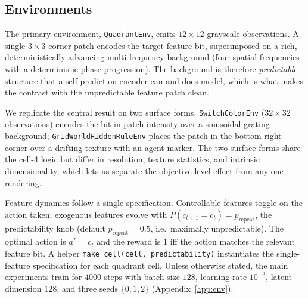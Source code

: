 \documentclass[11pt]{article}
\begin{document}
\subsection{Environments}
The primary environment, \texttt{QuadrantEnv}, emits $12\times12$ grayscale observations. A single
$3\times3$ corner patch encodes the target feature bit, superimposed on a rich,
deterministically-advancing multi-frequency background (four spatial frequencies with a
deterministic phase progression). The background is therefore \emph{predictable} structure that a
self-prediction encoder can and does model, which is what makes the contrast with the unpredictable
feature patch clean.

We replicate the central result on two surface forms. \texttt{SwitchColorEnv} ($32\times32$
observations) encodes the bit in patch intensity over a sinusoidal grating background;
\texttt{GridWorldHiddenRuleEnv} places the patch in the bottom-right corner over a drifting texture
with an agent marker. The two surface forms share the cell-4 logic but differ in resolution,
texture statistics, and intrinsic dimensionality, which lets us separate the objective-level effect
from any one rendering.

Feature dynamics follow a single specification. Controllable features toggle on the action taken;
exogenous features evolve with $P(c_{t+1}=c_t)=p_{\text{repeat}}$, the predictability knob
(default $p_{\text{repeat}}=0.5$, i.e.\ maximally unpredictable). The optimal action is
$a^\ast=c_t$ and the reward is $1$ iff the action matches the relevant feature bit. A helper
\texttt{make\_cell(cell, predictability)} instantiates the single-feature specification for each
quadrant cell. Unless otherwise stated, the main experiments train for $4000$ steps with batch
size $128$, learning rate $10^{-3}$, latent dimension $128$, and three seeds $\{0,1,2\}$
(Appendix~\ref{app:env}).
\end{document}

